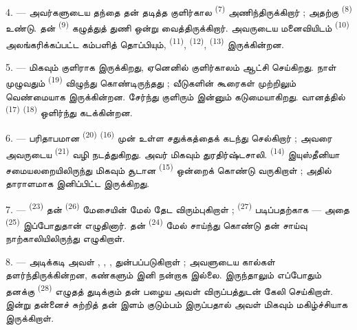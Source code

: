 4. --- அவர்களுடைய தந்தை தன் தடித்த குளிர்கால 
\textsuperscript{(7)} அணிந்திருக்கிறார் ; அதற்கு  \textsuperscript{(8)} உண்டு. தன்  \textsuperscript{(9)}
கழுத்துத் துணி ஒன்று வைத்திருக்கிறார். அவருடைய மனைவியிடம்
 \textsuperscript{(10)} அலங்கரிக்கப்பட்ட கம்பளித் தொப்பியும்,
 \textsuperscript{(11)}, 
\textsuperscript{(12)},  \textsuperscript{(13)}
இருக்கின்றன.

5. --- மிகவும் குளிராக இருக்கிறது, ஏனெனில் குளிர்காலம் ஆட்சி செய்கிறது.
நாள் முழுவதும்  \textsuperscript{(19)} விழுந்து கொண்டிருந்தது ;
வீடுகளின் கூரைகள் முற்றிலும் வெண்மையாக இருக்கின்றன. 
சேர்ந்து குளிரும் இன்னும் கடுமையாகிறது. வானத்தில் 
\textsuperscript{(17)}  \textsuperscript{(18)} ஒளிர்ந்து
 கடக்கின்றன.

\VUsaut{4.2mm}
\VUsaut{3.0mm}

6. --- பரிதாபமான  \textsuperscript{(20)}
 \textsuperscript{(16)} முன் உள்ள சதுக்கத்தைக் கடந்து
செல்கிறார் ; அவரை அவருடைய  \textsuperscript{(21)}
வழி நடத்துகிறது. அவர் மிகவும் துரதிர்ஷ்டசாலி. 
\textsuperscript{(14)} இயுஸ்தீனியா சமையலறையிலிருந்து மிகவும் சூடான
 \textsuperscript{(15)} ஒன்றைக் கொண்டு வருகிறாள் ; அதில்
தாராளமாக இனிப்பிட்ட  இருக்கிறது.

7. ---  \textsuperscript{(23)} தன்  \textsuperscript{(26)} மேசையின் மேல் தேட விரும்புகிறாள் ;
 \textsuperscript{(27)} படிப்பதற்காக — அதை
 \textsuperscript{(25)} இப்போதுதான் எழுதினார். தன்
 \textsuperscript{(24)} மேல் சாய்ந்து கொண்டு தன் சாய்வு
நாற்காலியிலிருந்து எழுகிறாள்.

8. --- அடிக்கடி அவள் , , ,  துன்பப்படுகிறாள் ;
அவளுடைய கால்கள் தளர்ந்திருக்கின்றன, கண்களும் இனி நன்றாக இல்லை. இருந்தாலும்
எப்போதும் தனக்கு  \textsuperscript{(28)} எழுதத்
துடிக்கும் தன் பழைய  அவள் விருப்பத்துடன் கேலி
செய்கிறாள். இன்று தன்னைச் சுற்றித் தன் இளம் குடும்பம் இருப்பதால் அவள்
மிகவும் மகிழ்ச்சியாக இருக்கிறாள்.

